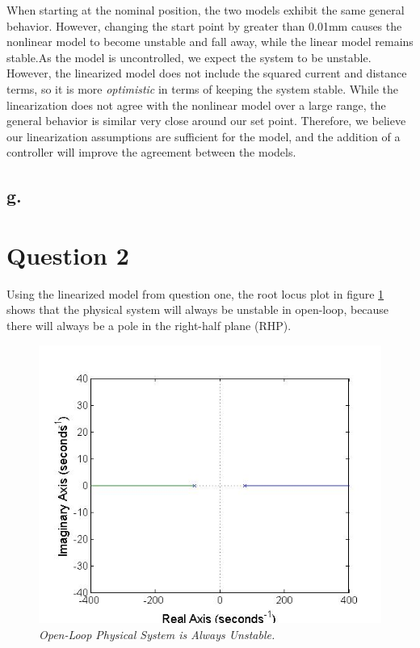 \documentclass{article}
\theoremstyle{plain}
\theoremstyle{definition}
\theoremstyle{remark}
\begin{document}
When starting at the nominal position, the two models exhibit the same general behavior. However, changing the start point by greater than 0.01mm causes the nonlinear model to become unstable and fall away, while the linear model remains stable.As the model is uncontrolled, we expect the system to be unstable. However, the linearized model does not include the squared current and distance terms, so it is more \emph{optimistic} in terms of keeping the system stable. While the linearization does not agree with the nonlinear model over a large range, the general behavior is similar very close around our set point. Therefore, we believe our linearization assumptions are sufficient for the model, and the addition of a controller will improve the agreement between the models.

\subsection*{g.}

\section*{Question 2}
Using the linearized model from question one, the root locus plot in figure \ref{Q2} shows that the physical system will always be unstable in open-loop, because there will always be a pole in the right-half plane (RHP).\\

\begin{figure}[h!]
\begin{center}
\includegraphics[width = 12cm]{FigureA}
\caption{\emph{Open-Loop Physical System is Always Unstable.}}
\label{Q2}
\end{center}
\end{figure}
\end{document}
